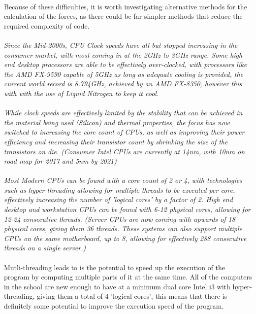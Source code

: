 \paragraph{}
Because of these difficulties, it is worth investigating alternative methods for the calculation of the forces, as there could be far simpler methods that reduce the required complexity of code.

\paragraph{}
\textit{Since the Mid-2000s, CPU Clock speeds have all but stopped increasing in the consumer market, with most coming in at the 2GHz to 3GHz range. Some high end desktop processors are able to be effectively over-clocked, with processors like the AMD FX-9590 capable of 5GHz as long as adequate cooling is provided, the current world record is 8.794GHz, achieved by an AMD FX-8350, however this with with the use of Liquid Nitrogen to keep it cool.}

\paragraph{}
\textit{While clock speeds are effectively limited by the stability that can be achieved in the material being used (Silicon) and thermal properties, the focus has now switched to increasing the core count of CPUs, as well as improving their power efficiency and increasing their transistor count by shrinking the size of the transistors on die. (Consumer Intel CPUs are currently at 14nm, with 10nm on road map for 2017 and 5nm by 2021)}

\paragraph{}
\textit{Most Modern CPUs can be found with a core count of 2 or 4, with technologies such as hyper-threading allowing for multiple threads to be executed per core, effectively increasing the number of 'logical cores' by a factor of 2. High end desktop and workstation CPUs can be found with 6-12 physical cores, allowing for 12-24 consecutive threads. (Server CPUs are now coming with upwards of 18 physical cores, giving them 36 threads. These systems can also support multiple CPUs on the same motherboard, up to 8, allowing for effectively 288 consecutive threads on a single server.)}

\paragraph{}
Mutli-threading leads to is the potential to speed up the execution of the program by computing multiple parts of it at the same time. All of the computers in the school are new enough to have at a minimum dual core Intel i3 with hyper-threading, giving them a total of 4 'logical cores', this means that there is definitely some potential to improve the execution speed of the program.

